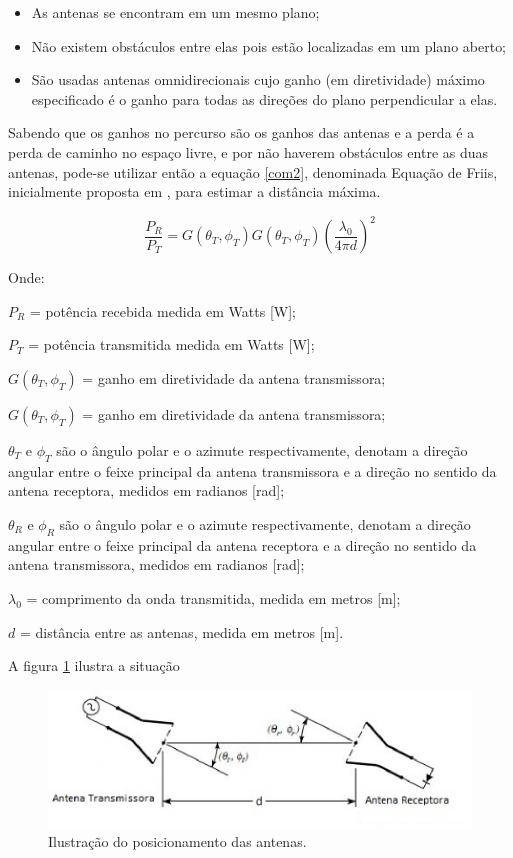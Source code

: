 \begin{itemize}
\item As antenas se encontram em um mesmo plano;
\item Não existem obstáculos entre elas pois estão localizadas em um plano aberto;
\item São usadas antenas omnidirecionais cujo ganho (em diretividade) máximo especificado é o ganho para todas as direções do plano perpendicular a elas.
\end{itemize}

Sabendo que os ganhos no percurso são os ganhos das antenas e a perda é a perda de caminho no espaço livre, e por não haverem obstáculos entre as duas antenas, pode-se utilizar então a equação \ref{com2}, denominada Equação de Friis, inicialmente proposta em \cite{1697062}, para estimar a distância máxima.

\begin{equation}
\label{com2}
\frac{P_{R}}{P_{T}} = G(\theta_{T},\phi_{T})G(\theta_{T},\phi_{T})\left ( \frac{\lambda _{0}}{4 \pi d} \right )^{2}
\end{equation}

Onde:

$P_{R}$ = potência recebida medida em Watts [W];

$P_{T}$ = potência transmitida medida em Watts [W];

$G(\theta_{T},\phi_{T})$ = ganho em diretividade da antena transmissora;

$G(\theta_{T},\phi_{T})$ = ganho em diretividade da antena transmissora;

$\theta_{T}$ e $\phi_{T}$ são o ângulo polar e o azimute respectivamente, denotam a direção angular entre o feixe principal da antena transmissora e a direção no sentido da antena receptora, medidos em radianos [rad];

$\theta_{R}$ e $\phi_{R}$ são o ângulo polar e o azimute respectivamente, denotam a direção angular entre o feixe principal da antena receptora e a direção no sentido da antena transmissora, medidos em radianos [rad];

$\lambda _{0}$ = comprimento da onda transmitida, medida em metros [m];

$d$ = distância entre as antenas, medida em metros [m].

A figura \ref{antenas} ilustra a situação

\begin{figure}[h]
	\centering
	\includegraphics[keepaspectratio=true,scale=0.8]{figuras/antenas}
	\caption{Ilustração do posicionamento das antenas.}
	\label{antenas}
\end{figure}


